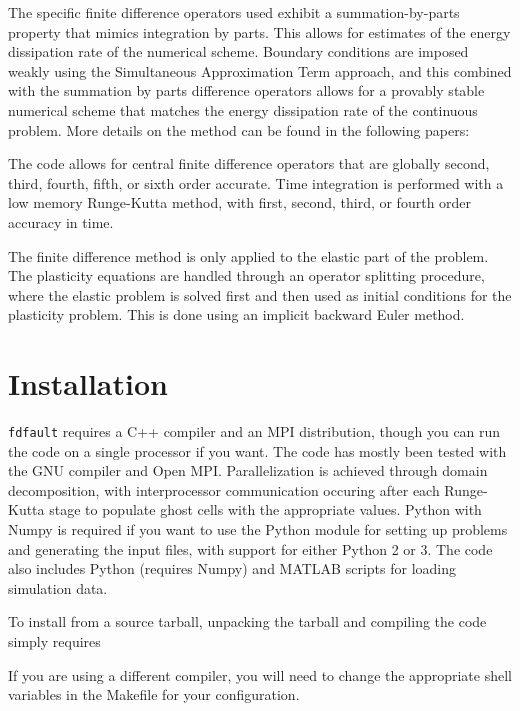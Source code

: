\documentclass[12pt]{article}   	%
\begin{document}
The specific finite difference operators used exhibit a summation-by-parts property that mimics integration by parts. This allows for estimates of the energy dissipation rate of the numerical scheme. Boundary conditions are imposed weakly using the Simultaneous Approximation Term approach, and this combined with the summation by parts difference operators allows for a provably stable numerical scheme that matches the energy dissipation rate of the continuous problem. More details on the method can be found in the following papers:

The code allows for central finite difference operators that are globally second, third, fourth, fifth, or sixth order accurate. Time integration is performed with a low memory Runge-Kutta method, with first, second, third, or fourth order accuracy in time.

The finite difference method is only applied to the elastic part of the problem. The plasticity equations are handled through an operator splitting procedure, where the elastic problem is solved first and then used as initial conditions for the plasticity problem. This is done using an implicit backward Euler method.

\section{Installation}

{\tt fdfault} requires a C++ compiler and an MPI distribution, though you can run the code on a single processor if you want. The code has mostly been tested with the GNU compiler and Open MPI. Parallelization is achieved through domain decomposition, with interprocessor communication occuring after each Runge-Kutta stage to populate ghost cells with the appropriate values. Python with Numpy is required if you want to use the Python module for setting up problems and generating the input files, with support for either Python 2 or 3. The code also includes Python (requires Numpy) and MATLAB scripts for loading simulation data.

To install from a source tarball, unpacking the tarball and compiling the code simply requires

\vspace{0.1in}

\vspace{0.1in}
\noindent If you are using a different compiler, you will need to change the appropriate shell variables in the Makefile for your configuration.
\end{document}
